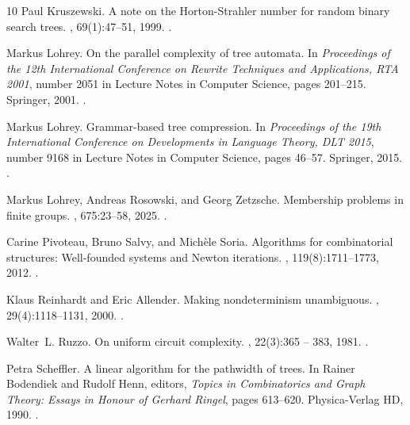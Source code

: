 \documentclass[a4paper,UKenglish,cleveref, autoref, thm-restate, numberwithinsect]{lipics-v2021}
\begin{document}
\begin{thebibliography}{10}
Paul Kruszewski.
\newblock A note on the {Horton-Strahler} number for random binary search
  trees.
, 69(1):47--51, 1999.
\newblock \href {https://doi.org/https://doi.org/10.1016/S0020-0190(98)00192-6}
  {}.

Markus Lohrey.
\newblock On the parallel complexity of tree automata.
\newblock In {\em Proceedings of the {12th} International Conference on Rewrite
  Techniques and Applications, RTA 2001}, number 2051 in Lecture Notes in
  Computer Science, pages 201--215. Springer, 2001.
\newblock \href {https://doi.org/10.1007/3-540-45127-7\_16}
  {}.

Markus Lohrey.
\newblock Grammar-based tree compression.
\newblock In {\em Proceedings of the 19th International Conference on
  Developments in Language Theory, {DLT} 2015}, number 9168 in Lecture Notes in
  Computer Science, pages 46--57. Springer, 2015.
\newblock \href {https://doi.org/10.1007/978-3-319-21500-6\_3}
  {}.

Markus Lohrey, Andreas Rosowski, and Georg Zetzsche.
\newblock Membership problems in finite groups.
, 675:23--58, 2025.
\newblock \href {https://doi.org/10.1016/j.jalgebra.2025.03.011}
  {}.

Carine Pivoteau, Bruno Salvy, and Mich{\`e}le Soria.
\newblock Algorithms for combinatorial structures: Well-founded systems and
  {Newton} iterations.
, 119(8):1711--1773,
  2012.
\newblock \href {https://doi.org/10.1016/j.jcta.2012.05.007}
  {}.

Klaus Reinhardt and Eric Allender.
\newblock Making nondeterminism unambiguous.
, 29(4):1118--1131, 2000.
\newblock \href {https://doi.org/10.1137/S0097539798339041}
  {}.

Walter~L. Ruzzo.
\newblock On uniform circuit complexity.
, 22(3):365 -- 383,
  1981.
\newblock \href {https://doi.org/10.1016/0022-0000(81)90038-6}
  {}.

Petra Scheffler.
\newblock A linear algorithm for the pathwidth of trees.
\newblock In Rainer Bodendiek and Rudolf Henn, editors, {\em Topics in
  Combinatorics and Graph Theory: Essays in Honour of {Gerhard Ringel}}, pages
  613--620. Physica-Verlag HD, 1990.
\newblock \href {https://doi.org/10.1007/978-3-642-46908-4_70}
  {}.


\end{thebibliography}
\end{document}
